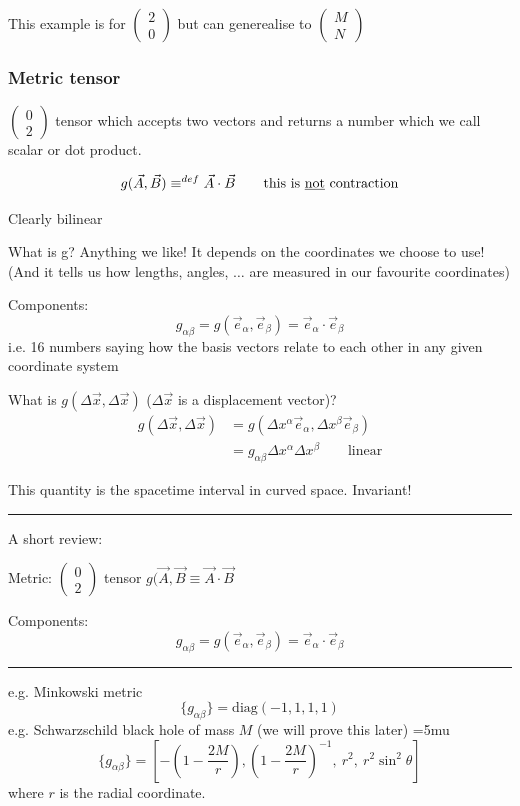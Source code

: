 \documentclass[a4paper]{article} %
\newcommand{\review}[1]
{
\hrule
A short review:

#1
\hrule
}
\newcommand{\pmx}[1]{
\begin{pmatrix}
#1
\end{pmatrix}
}
\begin{document}
This example is for $\pmx{2\\0}$ but can generealise to $\pmx{M\\N}$

\subsubsection{Metric tensor}
$\pmx{0\\2}$ tensor which accepts two vectors and returns a number which we call scalar or dot product.

\begin{equation}
g(\vec{A},\vec{B})\equiv^{def}\vec{A}\cdot \vec{B}\qquad\text{this is \underline{not} contraction}
\end{equation}

Clearly bilinear

What is g? Anything we like! It depends on the coordinates we choose to use! (And it tells us how lengths, angles, $\ldots$ are measured in our favourite coordinates)

Components: 
\begin{equation}
g_{\alpha\beta}=g(\vec{e}_{\alpha},\vec{e}_{\beta})=\vec{e}_{\alpha}\cdot \vec{e}_{\beta}
\end{equation}
i.e. 16 numbers saying how the basis vectors relate to each other in any given coordinate system

What is $g(\Delta\vec{x},\Delta\vec{x})$ ($\Delta\vec{x}$ is a displacement vector)?
\begin{align*}
g(\Delta\vec{x},\Delta\vec{x})&=g(\Delta x^{\alpha}\vec{e}_{\alpha},\Delta x^{\beta}\vec{e}_{\beta})\\
&=g_{\alpha\beta}\Delta x^{\alpha}\Delta x^{\beta} \qquad\text{linear}
\end{align*}

This quantity is the spacetime interval in curved space. Invariant!

\review{Metric: $\pmx{0\\2}$ tensor $g(\vec{A},\vec{B}\equiv \vec{A}\cdot\vec{B}$

Components: 
\begin{equation}
g_{\alpha\beta}=g(\vec{e}_{\alpha},\vec{e}_{\beta})=\vec{e}_{\alpha}\cdot \vec{e}_{\beta}
\end{equation}
}

e.g. Minkowski metric
\begin{equation}
\{g_{\alpha\beta}\}=\text{diag}(-1,1,1,1)
\end{equation}
e.g. Schwarzschild black hole of mass $M$ (we will prove this later)
\thinmuskip=5mu
\begin{equation}
\{g_{\alpha\beta}\}=\left[-\left(1-\frac{2M}{r}\right),\left(1-\frac{2M}{r}\right)^{-1},~r^2,~r^2\sin^2\theta\right]
\end{equation}
where $r$ is the radial coordinate.
\end{document}
